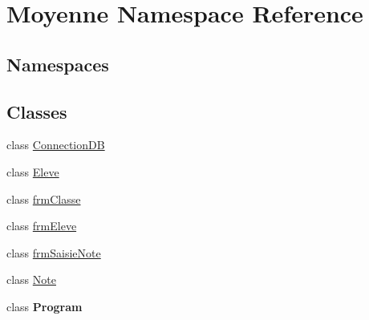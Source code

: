 \hypertarget{namespace_moyenne}{}\section{Moyenne Namespace Reference}
\label{namespace_moyenne}
\subsection*{Namespaces}
\begin{DoxyCompactItemize}
\end{DoxyCompactItemize}
\subsection*{Classes}
\begin{DoxyCompactItemize}
\item 
class \hyperlink{class_moyenne_1_1_connection_d_b}{Connection\+DB}
\item 
class \hyperlink{class_moyenne_1_1_eleve}{Eleve}
\item 
class \hyperlink{class_moyenne_1_1frm_classe}{frm\+Classe}
\item 
class \hyperlink{class_moyenne_1_1frm_eleve}{frm\+Eleve}
\item 
class \hyperlink{class_moyenne_1_1frm_saisie_note}{frm\+Saisie\+Note}
\item 
class \hyperlink{class_moyenne_1_1_note}{Note}
\item 
class {\bfseries Program}
\end{DoxyCompactItemize}
